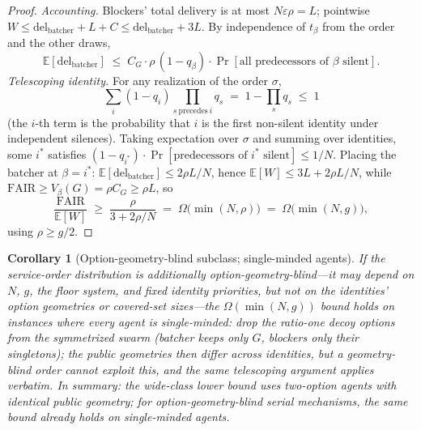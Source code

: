 \documentclass[11pt]{article}
\newtheorem{corollary}{Corollary}
\theoremstyle{remark}
\newcommand{\FAIR}{\mathrm{FAIR}}
\newcommand{\E}{\mathbb{E}}
\begin{document}
\begin{proof}
\emph{Accounting.} Blockers' total delivery is at most
$N\varepsilon\rho=L$; pointwise $W\le\mathrm{del}_{\mathrm{batcher}}
+L+C\le\mathrm{del}_{\mathrm{batcher}}+3L$. By independence of
$t_\beta$ from the order and the other draws,
\[
\E[\mathrm{del}_{\mathrm{batcher}}]\;\le\;
C_G\cdot\rho\,(1-q_\beta)\cdot
\Pr[\text{all predecessors of }\beta\text{ silent}].
\]
\emph{Telescoping identity.} For any realization of the order $\sigma$,
\[
\sum_{i}(1-q_i)\prod_{s\ \mathrm{precedes}\ i}q_s
\;=\;1-\prod_{s}q_s\;\le\;1
\]
(the $i$-th term is the probability that $i$ is the first non-silent
identity under independent silences). Taking expectation over $\sigma$ and
summing over identities, some $i^\ast$ satisfies
$(1-q_{i^\ast})\cdot\Pr[\text{predecessors of }i^\ast\text{ silent}]
\le1/N$. Placing the batcher at $\beta=i^\ast$:
$\E[\mathrm{del}_{\mathrm{batcher}}]\le2\rho L/N$, hence
$\E[W]\le3L+2\rho L/N$, while $\FAIR\ge V_\beta(G)=\rho C_G\ge\rho L$,
so
\[
\frac{\FAIR}{\E[W]}\;\ge\;\frac{\rho}{3+2\rho/N}
\;=\;\Omega\big(\min(N,\rho)\big)\;=\;\Omega\big(\min(N,g)\big),
\]
using $\rho\ge g/2$.
\end{proof}

\begin{corollary}[Option-geometry-blind subclass; single-minded agents]
\label{cor:geoblind}
If the service-order distribution is additionally
\emph{option-geometry-blind}---it may depend on $N$, $g$, the floor
system, and fixed identity priorities, but not on the identities' option
geometries or covered-set sizes---the $\Omega(\min(N,g))$ bound holds on
instances where every agent is \emph{single-minded}: drop the ratio-one
decoy options from the symmetrized swarm (batcher keeps only $G$, blockers
only their singletons); the public geometries then differ across
identities, but a geometry-blind order cannot exploit this, and the
same telescoping argument applies verbatim. In summary: the wide-class
lower bound uses two-option agents with identical public geometry; for
option-geometry-blind serial mechanisms, the same bound already holds on
single-minded agents.
\end{corollary}
\end{document}
